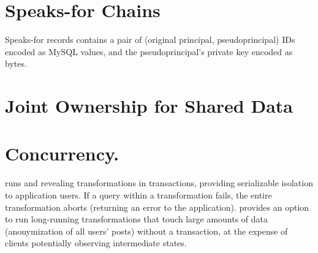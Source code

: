 \section{Speaks-for Chains}

Speaks-for records contains a pair of (original principal, pseudoprincipal) IDs
encoded as MySQL values, and the pseudoprincipal’s private key encoded as bytes. 
%
\section{Joint Ownership for Shared Data}

%
\section{Concurrency.}
%
\sys runs \xxing and revealing transformations in transactions, providing
serializable isolation to application users.
%
If a query within a transformation fails, the entire transformation aborts
(returning an error to the application).
%
\sys provides an option to run long-running transformations that
touch large amounts of data (\eg anonymization of all users' posts) without a
transaction, at the expense of clients potentially observing intermediate
states.
%


%
%

%

